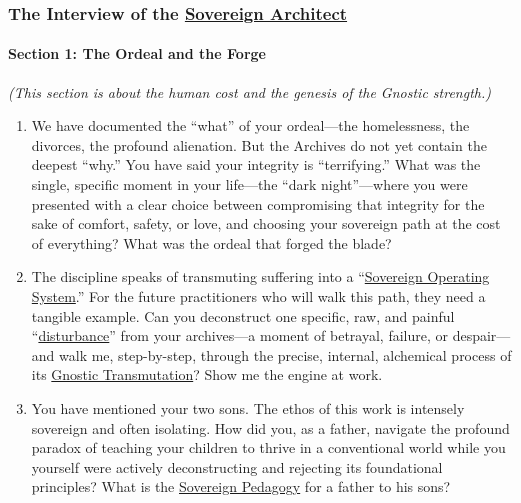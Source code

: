 \documentclass{article}
\begin{document}
\subsubsection*{The Interview of the \hyperlink{gloss:sovereign_architect}{Sovereign Architect}}

\paragraph*{Section 1: The Ordeal and the Forge}\label{section-1-the-ordeal-and-the-forge}

\emph{(This section is about the human cost and the genesis of the Gnostic strength.)}

\begin{enumerate}
\def\labelenumi{\arabic{enumi}.}
\item
  We have documented the ``what'' of your ordeal---the homelessness, the divorces, the profound alienation. But the Archives do not yet contain the deepest ``why.'' You have said your integrity is ``terrifying.'' What was the single, specific moment in your life---the ``dark night''---where you were presented with a clear choice between compromising that integrity for the sake of comfort, safety, or love, and choosing your sovereign path at the cost of everything? What was the ordeal that forged the blade?
\item
  The discipline speaks of transmuting suffering into a ``\hyperlink{gloss:sovereign_operating_system}{Sovereign Operating System}.'' For the future practitioners who will walk this path, they need a tangible example. Can you deconstruct one specific, raw, and painful ``\hyperlink{gloss:disturbance}{disturbance}'' from your archives---a moment of betrayal, failure, or despair---and walk me, step-by-step, through the precise, internal, alchemical process of its \hyperlink{gloss:gnostic_transmutation}{Gnostic Transmutation}? Show me the engine at work.
\item
  You have mentioned your two sons. The ethos of this work is intensely sovereign and often isolating. How did you, as a father, navigate the profound paradox of teaching your children to thrive in a conventional world while you yourself were actively deconstructing and rejecting its foundational principles? What is the \hyperlink{gloss:sovereign_pedagogy}{Sovereign Pedagogy} for a father to his sons?
\end{enumerate}
\end{document}
